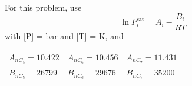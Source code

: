 \documentclass[calculator,allquestions,datasheet]{exam_newMarcus2}
\newcommand{\frc}{\displaystyle\frac}
\begin{document}
\begin{question}
{}

For this problem, use 
\begin{displaymath}
   \ln P_{i}^{\text{sat}} = A_{i} - \frc{B_{i}}{RT}
\end{displaymath} 
with [P] = bar and [T] = K, and
    \begin{center}
       \begin{tabular}{l l l} 
          $A_{nC_{5}}=10.422$ & $A_{nC_{6}}=10.456$ & $A_{nC_{7}}=11.431$ \\
          $B_{nC_{5}}=26799$  & $B_{nC_{6}}=29676$  & $B_{nC_{7}}=35200$  
       \end{tabular}
    \end{center}
%
\end{question}

\clearpage
\end{document}
